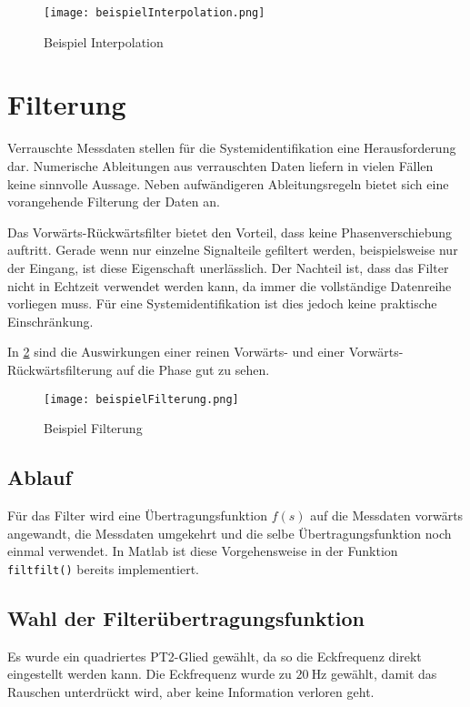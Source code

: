 \begin{figure}[h!]
	\centering
	\texttt{[image: beispielInterpolation.png]}
	\caption{Beispiel Interpolation}
	\label{fig:interpBsp}
\end{figure}





\section{Filterung} \label{section:filterung}%
Verrauschte Messdaten stellen für die Systemidentifikation eine Herausforderung dar. Numerische Ableitungen aus verrauschten 
Daten liefern in vielen Fällen keine sinnvolle Aussage. Neben aufwändigeren Ableitungsregeln bietet sich eine vorangehende 
Filterung der Daten an.\par
Das Vorwärts-Rückwärtsfilter bietet den Vorteil, dass keine Phasenverschiebung auftritt. Gerade wenn nur einzelne Signalteile 
gefiltert werden, beispielsweise nur der Eingang, ist diese Eigenschaft unerlässlich. Der Nachteil ist, dass das Filter nicht 
in Echtzeit verwendet werden kann, da immer die vollständige Datenreihe 
vorliegen muss. Für eine Systemidentifikation ist dies jedoch keine praktische 
Einschränkung. \cite{Gschwandtner2019}

In \cref{fig:filterBsp} sind die Auswirkungen einer reinen Vorwärts- und einer Vorwärts-Rückwärtsfilterung auf die Phase 
gut zu sehen.

\begin{figure}[h!]
	\centering
	\texttt{[image: beispielFilterung.png]}
	\caption{Beispiel Filterung}
	\label{fig:filterBsp}
\end{figure}


\subsection{Ablauf}
Für das Filter wird eine Übertragungsfunktion $f(s)$ auf die Messdaten vorwärts 
angewandt, die Messdaten umgekehrt und die selbe Übertragungsfunktion noch 
einmal verwendet. In Matlab ist diese Vorgehensweise in der Funktion \texttt{filtfilt()} 
bereits implementiert. 


\subsection{Wahl der Filterübertragungsfunktion}
Es wurde ein quadriertes PT2-Glied gewählt, da so die Eckfrequenz direkt eingestellt werden kann. Die Eckfrequenz wurde zu $ 
\SI{20}{\hertz} $ gewählt, damit das Rauschen unterdrückt wird, aber keine Information verloren geht.

